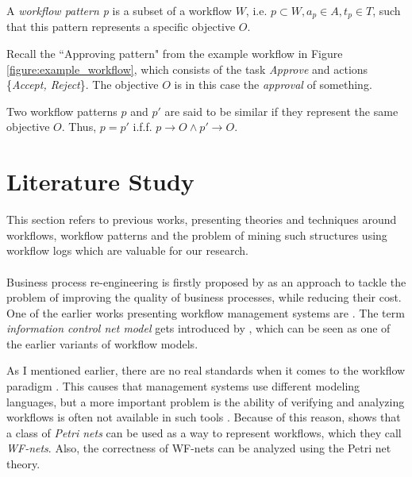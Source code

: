 \documentclass[a4paper,11pt]{article}
\begin{document}
\begin{defn}
A \textit{workflow pattern p} is a subset of a workflow $W$, i.e. $p \subset W, a_p \in A, t_p \in T$, such that this pattern represents a specific objective $O$.
\end{defn}
Recall the ``Approving pattern" from the example workflow in Figure \ref{figure:example_workflow}, which consists of the task \textit{Approve} and actions \{\textit{Accept, Reject}\}. The objective $O$ is in this case the \textit{approval} of something.

\begin{defn}
Two workflow patterns $p$ and $p'$ are said to be similar if they represent the same objective $O$. Thus, $p=p'$ i.f.f. $p \rightarrow O \wedge p' \rightarrow O$.
\end{defn}


\section{Literature Study}
\label{section:literature}
This section refers to previous works, presenting theories and techniques around workflows, workflow patterns and the problem of mining such structures using workflow logs which are valuable for our research.\\
\\
Business process re-engineering is firstly proposed by \cite{Hammer1990} as an approach to tackle the problem of improving the quality of business processes, while reducing their cost. One of the earlier works presenting workflow management systems are \cite{EngelGLT79,Ellis1982}. The term \textit{information control net model} gets introduced by \cite{Ellis1982}, which can be seen as one of the earlier variants of workflow models. 

As I mentioned earlier, there are no real standards when it comes to the workflow paradigm \cite{VanderAalst1997}. This causes that management systems use different modeling languages, but a more important problem is the ability of verifying and analyzing workflows is often not available in such tools \cite{VanderAalst1997}. Because of this reason, \cite{VanderAalst1997} shows that a class of \textit{Petri nets} can be used as a way to represent workflows, which they call \textit{WF-nets}. Also, the correctness of WF-nets can be analyzed using the Petri net theory. 

\end{document}
